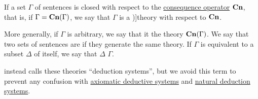 \begin{definition}\label{def:logical_theory}
  If a set \( \Gamma \) of sentences is closed with respect to the \hyperref[def:consequence_operator]{consequence operator} \( \op*{Cn} \), that is, if \( \Gamma = \op*{Cn}(\Gamma) \), we say that \( \Gamma \) is a \term[ru=теория (\cite[3.1.1]{Герасимов2011})]{theory} with respect to \( \op*{Cn} \).

  \begin{thmenum}
     More generally, if \( \Gamma \) is arbitrary, we say that it  the theory \( \op*{Cn}(\Gamma) \).
     We say that two sets of sentences are  if they generate the same theory.
    \mimprovised If \( \Gamma \) is equivalent to a subset \( \Delta \) of itself, we say that \( \Delta \)  \( \Gamma \).
  \end{thmenum}
\end{definition}
\begin{comments}
  \item {} instead calls these theories \enquote{deduction systems}, but we avoid this term to prevent any confusion with \hyperref[def:axiomatic_derivation_system]{axiomatic deductive systems} and \hyperref[def:propositional_natural_deduction_systems]{natural deduction systems}.
\end{comments}

